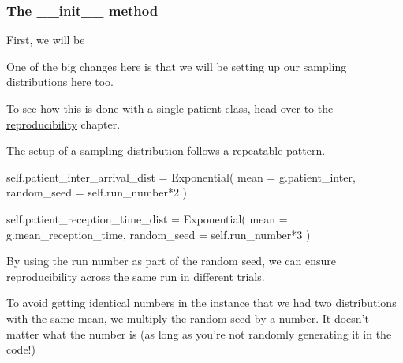 \documentclass[
  letterpaper,
  DIV=11,
  numbers=noendperiod]{scrreprt}
\newenvironment{Shaded}{}{}
\newcommand{\DecValTok}[1]{\textcolor[rgb]{0.00,0.36,0.77}{#1}}
\newcommand{\NormalTok}[1]{\textcolor[rgb]{0.14,0.16,0.18}{#1}}
\newcommand{\OperatorTok}[1]{\textcolor[rgb]{0.14,0.16,0.18}{#1}}
\newcommand{\VariableTok}[1]{\textcolor[rgb]{0.89,0.38,0.04}{#1}}
\begin{document}
\subsubsection{The \_\_init\_\_ method}\label{the-__init__-method}

First, we will be

\begin{tcolorbox}[enhanced jigsaw, colframe=quarto-callout-note-color-frame, bottomtitle=1mm, breakable, rightrule=.15mm, coltitle=black, colbacktitle=quarto-callout-note-color!10!white, opacityback=0, leftrule=.75mm, arc=.35mm, toptitle=1mm, title=\textcolor{quarto-callout-note-color}{\faInfo}\hspace{0.5em}{Note}, titlerule=0mm, colback=white, toprule=.15mm, bottomrule=.15mm, left=2mm, opacitybacktitle=0.6]

One of the big changes here is that we will be setting up our sampling
distributions here too.

To see how this is done with a single patient class, head over to the
\href{reproducibility.qmd}{reproducibility} chapter.

The setup of a sampling distribution follows a repeatable pattern.

\begin{Shaded}
\begin{Highlighting}[]
\VariableTok{self}\NormalTok{.patient\_inter\_arrival\_dist }\OperatorTok{=}\NormalTok{ Exponential(}
\NormalTok{    mean }\OperatorTok{=}\NormalTok{ g.patient\_inter,}
\NormalTok{    random\_seed }\OperatorTok{=} \VariableTok{self}\NormalTok{.run\_number}\OperatorTok{*}\DecValTok{2}
\NormalTok{    )}
\end{Highlighting}
\end{Shaded}

\begin{Shaded}
\begin{Highlighting}[]
\VariableTok{self}\NormalTok{.patient\_reception\_time\_dist }\OperatorTok{=}\NormalTok{ Exponential(}
\NormalTok{    mean }\OperatorTok{=}\NormalTok{ g.mean\_reception\_time,}
\NormalTok{    random\_seed }\OperatorTok{=} \VariableTok{self}\NormalTok{.run\_number}\OperatorTok{*}\DecValTok{3}
\NormalTok{    )}
\end{Highlighting}
\end{Shaded}

By using the run number as part of the random seed, we can ensure
reproducibility across the same run in different trials.

To avoid getting identical numbers in the instance that we had two
distributions with the same mean, we multiply the random seed by a
number. It doesn't matter what the number is (as long as you're not
randomly generating it in the code!)

\end{tcolorbox}
\end{document}
